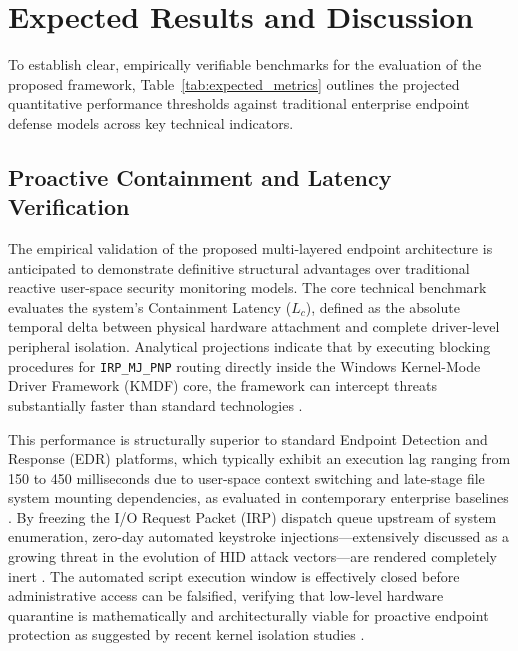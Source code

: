 \documentclass{ieeeaccess}
\begin{document}
\section{Expected Results and Discussion}
\label{sec:expected_results}

To establish clear, empirically verifiable benchmarks for the evaluation of the proposed framework, Table~\ref{tab:expected_metrics} outlines the projected quantitative performance thresholds against traditional enterprise endpoint defense models across key technical indicators.

\subsection{Proactive Containment and Latency Verification}
The empirical validation of the proposed multi-layered endpoint architecture is anticipated to demonstrate definitive structural advantages over traditional reactive user-space security monitoring models. The core technical benchmark evaluates the system's Containment Latency ($L_c$), defined as the absolute temporal delta between physical hardware attachment and complete driver-level peripheral isolation. Analytical projections indicate that by executing blocking procedures for \texttt{IRP\_MJ\_PNP} routing directly inside the Windows Kernel-Mode Driver Framework (KMDF) core, the framework can intercept threats substantially faster than standard technologies \cite{ref18}.

This performance is structurally superior to standard Endpoint Detection and Response (EDR) platforms, which typically exhibit an execution lag ranging from 150 to 450 milliseconds due to user-space context switching and late-stage file system mounting dependencies, as evaluated in contemporary enterprise baselines \cite{ref19}. By freezing the I/O Request Packet (IRP) dispatch queue upstream of system enumeration, zero-day automated keystroke injections—extensively discussed as a growing threat in the evolution of HID attack vectors—are rendered completely inert . The automated script execution window is effectively closed before administrative access can be falsified, verifying that low-level hardware quarantine is mathematically and architecturally viable for proactive endpoint protection as suggested by recent kernel isolation studies \cite{ref20}.
\end{document}
